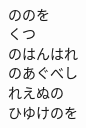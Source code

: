 \documentclass[10pt,b5j]{tarticle} %
\begin{document}
\begin{enumerate}
\begin{minipage}[c]{\blocksize}
    \end{minipage}
    \begin{minipage}[c]{\blocksize}
        
        \vspace{\linespace}
        \item~\\
        ののを\\
        くつ\\
        のはんはれ\\
        のあぐべし\\
        れえぬの\\
        ひゆけのを
    
    \end{minipage}
\end{enumerate} %
\end{document}
